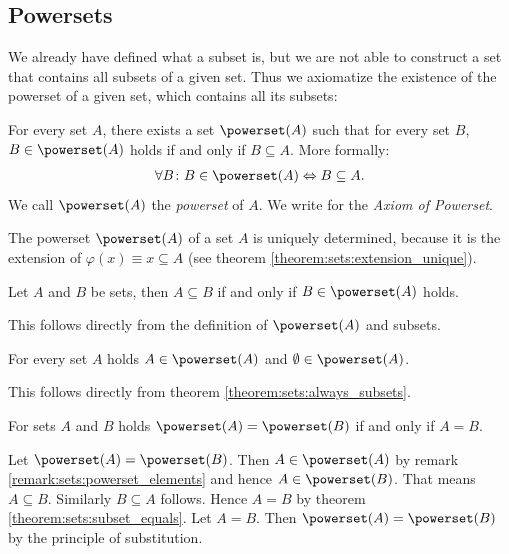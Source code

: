 \subsection{Powersets}

We already have defined what a subset is, but we are not able to construct a set that contains all subsets of a given set. Thus we axiomatize the existence of the powerset of a given set, which contains all its subsets:

\begin{axiom}[Powerset]
    For every set $A$, there exists a set $\powerset(A)$ such that for every set $B$, $B\in\powerset(A)$ holds if and only if $B\subseteq A$. More formally:
    \begin{align}\forall B\colon B\in\powerset(A)\Leftrightarrow B\subseteq A.\end{align}
    We call $\powerset(A)$ the \emph{powerset} of $A$. We write  for the \emph{Axiom of Powerset}.
\end{axiom}

\begin{remarks}
    \begin{remarkenumerate}
        \item The powerset $\powerset(A)$ of a set $A$ is uniquely determined, because it is the extension of $\varphi(x)\equiv x\subseteq A$ (see theorem \ref{theorem:sets:extension_unique}).
        \item Let $A$ and $B$ be sets, then $A\subseteq B$ if and only if $B\in\powerset(A)$ holds.
        \begin{miniproof}
            This follows directly from the definition of $\powerset(A)$ and subsets.
        \end{miniproof}
        \item\label{remark:sets:powerset_elements} For every set $A$ holds $A\in\powerset(A)$ and $\emptyset\in\powerset(A)$.
        \begin{miniproof}
            This follows directly from theorem \ref{theorem:sets:always_subsets}.
        \end{miniproof}
        \item For sets $A$ and $B$ holds $\powerset(A)=\powerset(B)$ if and only if $A=B$.
        \begin{miniproof}
            \proofright Let $\powerset(A)=\powerset(B)$. Then $A\in\powerset(A)$ by remark \ref{remark:sets:powerset_elements} and hence $A\in\powerset(B)$. That means $A\subseteq B$. Similarly $B\subseteq A$ follows. Hence $A=B$ by theorem \ref{theorem:sets:subset_equals}.
            \proofleft Let $A=B$. Then $\powerset(A)=\powerset(B)$ by the principle of substitution.
        \end{miniproof}
    \end{remarkenumerate}
\end{remarks}

